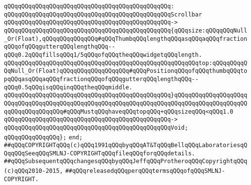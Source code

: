 \verb|qQQqqQQqqQQqqQQqqQQqqQQqqQQqqQQqqQQqqQQqqQQqqQQq:|\newline
\verb|qQQqqQQqqQQqqQQqqQQqqQQqqQQqqQQqqQQqqQQqqQQqqQQqScrollbar|\newline
\verb|qQQqqQQqqQQqqQQqqQQqqQQqqQQqqQQqqQQqqQQqqQQqqQQq->|\newline
\verb|qQQqqQQqqQQqqQQqqQQqqQQqqQQqqQQqqQQqqQQqqQQqqQQq{qQQqsize:qQQqqQQqNull_Or(Float),qQQqqQQqqQQqqQQq#qQQqThumbqQQqlengthqQQqasqQQqaqQQqfractionqQQqofqQQqgutterqQQqlengthqQQq--qQQq0.2qQQqfillsqQQq1/5qQQqofqQQqtheqQQqwidgetqQQqlength.|\newline
\verb|qQQqqQQqqQQqqQQqqQQqqQQqqQQqqQQqqQQqqQQqqQQqqQQqqQQqqQQqtop:qQQqqQQqqQQqNull_Or(Float)qQQqqQQqqQQqqQQqqQQq#qQQqPositionqQQqofqQQqthumbqQQqtopqQQqasqQQqaqQQqfractionqQQqofqQQqgutterqQQqlengthqQQq--qQQq0.5qQQqisqQQqinqQQqtheqQQqmiddle.|\newline
\verb|qQQqqQQqqQQqqQQqqQQqqQQqqQQqqQQqqQQqqQQqqQQqqQQq}qQQqqQQqqQQqqQQqqQQqqQQqqQQqqQQqqQQqqQQqqQQqqQQqqQQqqQQqqQQqqQQqqQQqqQQqqQQqqQQqqQQqqQQqqQQqqQQqqQQqqQQqqQQq#qQQqMustqQQqhaveqQQqtopqQQq+qQQqsizeqQQq<qQQq1.0|\newline
\verb|qQQqqQQqqQQqqQQqqQQqqQQqqQQqqQQqqQQqqQQqqQQqqQQq->|\newline
\verb|qQQqqQQqqQQqqQQqqQQqqQQqqQQqqQQqqQQqqQQqqQQqqQQqVoid;|\newline
\verb|qQQqqQQqqQQqqQQq};|\newline
\newline
\verb|end;|\newline
\newline
\verb|##qQQqCOPYRIGHTqQQq(c)qQQq1991qQQqbyqQQqAT&TqQQqBellqQQqLaboratoriesqQQqqQQqSeeqQQqSMLNJ-COPYRIGHTqQQqfileqQQqforqQQqdetails.|\newline
\verb|##qQQqSubsequentqQQqchangesqQQqbyqQQqJeffqQQqProtheroqQQqCopyrightqQQq(c)qQQq2010-2015,|\newline
\verb|##qQQqreleasedqQQqperqQQqtermsqQQqofqQQqSMLNJ-COPYRIGHT.|\newline

